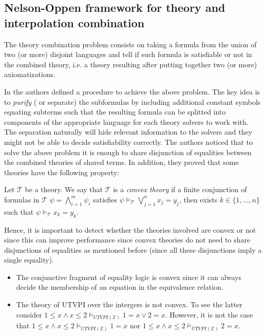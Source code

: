 \subsection{Nelson-Oppen framework for theory and interpolation
combination}

The theory combination problem consists on taking a 
formula from the union of two (or more) disjoint 
languages and tell if such formula is satisfiable
or not in the combined theory, i.e. a theory resulting
after putting together two (or more) axiomatizations.

In \cite{10.1145/357073.357079} the authors defined a procedure
to achieve the above problem. The key idea is to \emph{purify} (
or separate) the subformulas by including additional constant 
symbols equating subterms such that the resulting formula 
can be splitted into components of the appropriate language 
for each theory solvers to work with. The separation naturally
will hide relevant information to the solvers and they 
might not be able to decide satisfiability correctly.
The authors noticed that to solve the above problem it is enough to 
share disjunction of equalities between the combined theories of shared
terms. In addition, they proved that some theories have the 
following property:

\begin{definition}
  Let $\mathcal{T}$ be a theory. We say that $\mathcal{T}$
  is a \emph{convex theory} if a finite conjunction of formulas 
  in $\mathcal{T}$ $\psi = \bigwedge_{i = 1}^m \psi_i$ satisfies
  $\psi \models_{\mathcal{T}} \bigvee_{j = 1}^n 
  x_j = y_j$, then exists $k \in \{1, \dots, n \}$ such that 
  $\psi \models_{\mathcal{T}} x_k = y_k$.
\end{definition}

Hence, it is important to detect
whether the theories involved are convex or not since 
this can improve performance since convex theories do not
need to share disjunctions of equalities as mentioned before
(since all these disjunctions imply a single equality).

\begin{example}
  \begin{itemize}
    \item The conjunctive fragment of equality logic is convex since
      it can always decide the membership of an equation in the 
      equivalence relation. 
    \item The theory of UTVPI over the intergers is not 
      convex. To see the latter consider
      $1 \leq x \land x \leq 2 \models_{UTVPI(\mathbb{Z})} 1 = x \lor 2 = x$.
      However, it is not the case that 
      $1 \leq x \land x \leq 2 \models_{UTVPI(\mathbb{Z})} 1 = x$
      nor 
      $1 \leq x \land x \leq 2 \models_{UTVPI(\mathbb{Z})} 2 = x$.
  \end{itemize}
\end{example}

